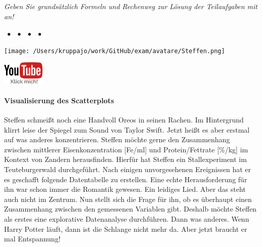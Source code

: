\documentclass[a4paper, 9pt]{scrartcl}\usepackage[]{graphicx}\usepackage[]{xcolor}
\begin{document}
\textit{Geben Sie grundsätzlich Formeln und Rechenweg zur Lösung der Teilaufgaben mit an!} \\[1Ex]
 

 
\ifcollection
\begin{flushright}
\tiny\vspace{-3Ex}
\textbf{\examinhaltstart}
\exammodulemathstat $\;\bullet$
\exammodulestat $\;\bullet$
\exammodulestatbbv $\;\bullet$
\exammodulestatversuch $\;\bullet$
\exammodulebiostat
\vspace{-4Ex}
\end{flushright}
\begin{minipage}[t]{0.5\textwidth}
\texttt{[image: /Users/kruppajo/work/GitHub/exam/avatare/Steffen.png]}
\end{minipage}
\begin{minipage}[t]{0.5\textwidth}
\hfill
\href{https://youtu.be/VAqiUdV4WQ0}{\includegraphics[width = 2cm]{img/youtube}}
\end{minipage}
\vspace{-3ex}
\fi




\ifcollection
\paragraph{Visualisierung des Scatterplots}
\fi

Steffen schmeißt noch eine Handvoll Oreos in seinen Rachen. Im Hintergrund klirrt leise der Spiegel zum Sound von Taylor Swift. Jetzt heißt es aber erstmal auf was anderes konzentrieren. Steffen möchte gerne den Zusammenhang zwischen mittlerer Eisenkonzentration [Fe/ml] und Protein/Fettrate [\%/kg] im Kontext von Zandern herausfinden. Hierfür hat Steffen ein Stallexperiment im Teuteburgerwald durchgeführt. Nach einigen unvorgesehenen Ereignissen hat er es geschafft folgende Datentabelle zu erstellen. Eine echte Herausforderung für ihn war schon immer die Romantik gewesen. Ein leidiges Lied. Aber das steht auch nicht im Zentrum. Nun stellt sich die Frage für ihn, ob es überhaupt einen Zusammenhang zwischen den gemessenen Variablen gibt. Deshalb möchte Steffen als erstes eine explorative Datenanalyse durchführen. Dann was anderes. Wenn Harry Potter läuft, dann ist die Schlange nicht mehr da. Aber jetzt braucht er mal Entspannung!
\end{document}
